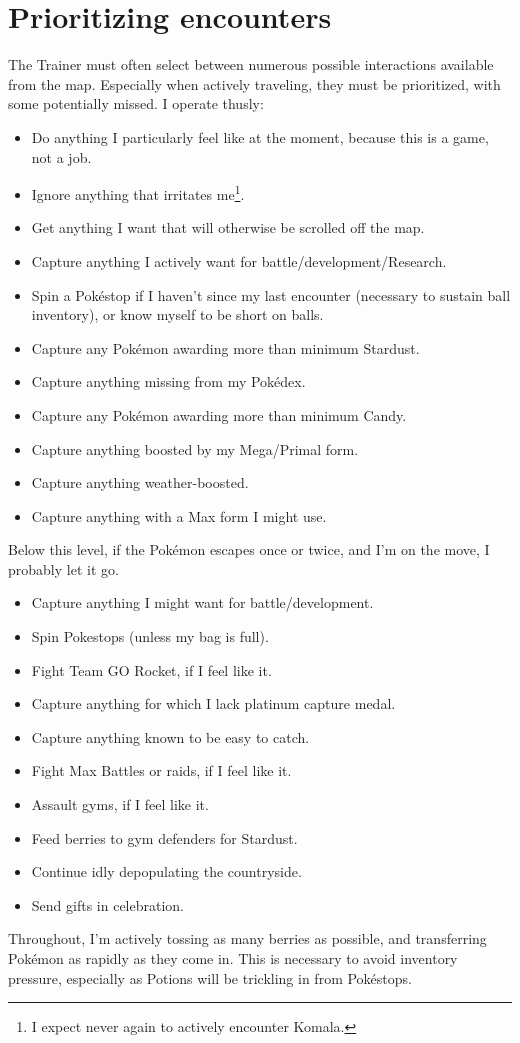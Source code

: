 \section{Prioritizing encounters}
\label{sec:prioritymap}
The Trainer must often select between numerous possible interactions available from the map.
Especially when actively traveling, they must be prioritized, with some potentially missed.
I operate thusly:
\begin{itemize}
\item Do anything I particularly feel like at the moment, because this is a game, not a job.
\item Ignore anything that irritates me\footnote{I expect never again to actively encounter Komala.}.
\item Get anything I want that will otherwise be scrolled off the map.
\item Capture anything I actively want for battle/development/Research.
\item Spin a Pokéstop if I haven't since my last encounter (necessary to sustain ball inventory),
       or know myself to be short on balls.
\item Capture any Pokémon awarding more than minimum Stardust.
\item Capture anything missing from my Pokédex.
\item Capture any Pokémon awarding more than minimum Candy.
\item Capture anything boosted by my Mega/Primal form.
\item Capture anything weather-boosted.
\item Capture anything with a Max form I might use.
\end{itemize}
Below this level, if the Pokémon escapes once or twice, and I'm on the move,
I probably let it go.
\begin{itemize}
\item Capture anything I might want for battle/development.
\item Spin Pokestops (unless my bag is full).
\item Fight Team GO Rocket, if I feel like it.
\item Capture anything for which I lack platinum capture medal.
\item Capture anything known to be easy to catch.
\item Fight Max Battles or raids, if I feel like it.
\item Assault gyms, if I feel like it.
\item Feed berries to gym defenders for Stardust.
\item Continue idly depopulating the countryside.
\item Send gifts in celebration.
\end{itemize}
Throughout, I'm actively tossing as many berries as possible, and
 transferring Pokémon as rapidly as they come in.
This is necessary to avoid inventory pressure, especially as
 Potions will be trickling in from Pokéstops.

